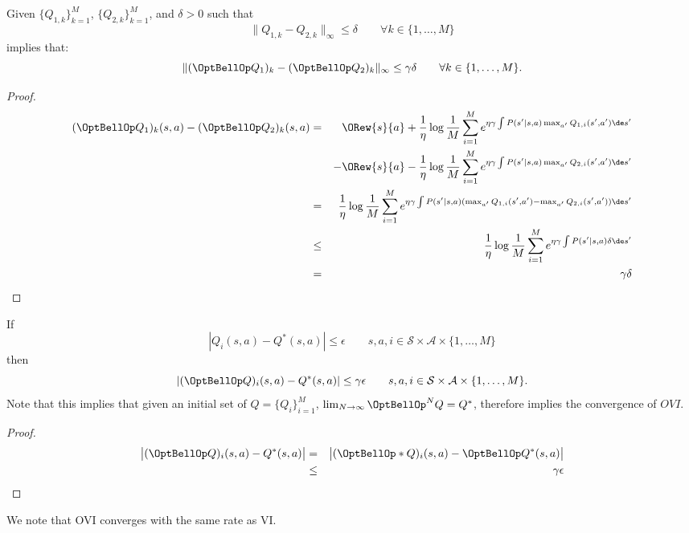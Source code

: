 \begin{lemma}
	Given $\{Q_{1,k}\}_{k=1}^M$, $\{Q_{2,k}\}_{k=1}^M$, and $\delta > 0$ such that
	\begin{equation}
	\|Q_{1,k} - Q_{2,k} \|_{\infty} \leq \delta \quad \quad \forall k \in \{1,\dots,M\} \nonumber
	\end{equation}
	implies that:
	\begin{equation}
	\| (\OptBellOp Q_{1})_k - (\OptBellOp Q_{2})_k \|_{\infty} \leq \gamma\delta \quad \quad \forall k \in \{1,\dots,M\}. \nonumber
	\end{equation}
	\begin{proof}
		\begin{eqnarray*}
			(\OptBellOp Q_{1})_k(s,a) - (\OptBellOp Q_{2})_k(s,a) & = & \ORew{s}{a} +  \frac{1}{\eta}\log \frac{1}{M} \sum_{i=1}^{M} e^{\eta\gamma \int P(s'|s,a) \max_{a'} Q_{1,i}(s',a')\de s'}  \nonumber \\
			& & -\ORew{s}{a} -  \frac{1}{\eta}\log \frac{1}{M} \sum_{i=1}^{M} e^{\eta\gamma \int P(s'|s,a) \max_{a'} Q_{2,i}(s',a')\de s'}  \nonumber \\
			&= &  \frac{1}{\eta}\log \frac{1}{M} \sum_{i=1}^{M} e^{\eta\gamma \int P(s'|s,a) (\max_{a'} Q_{1,i}(s',a') - \max_{a'} Q_{2,i}(s',a'))\de s'}  \nonumber \\
			&\leq &  \frac{1}{\eta}\log \frac{1}{M} \sum_{i=1}^{M} e^{\eta\gamma \int P(s'|s,a) \delta \de s'}  \nonumber \\
			&= & \gamma \delta \nonumber
		\end{eqnarray*}
	\end{proof}
\end{lemma}

\begin{theorem}
	If 
	\begin{equation}
	|Q_i(s,a) - Q^*(s,a)| \leq \epsilon \quad \quad s,a,i \in \mathcal{S} \times \mathcal{A} \times \{1, \dots, M\}
	\end{equation}
	then 
	\begin{equation}
	| (\OptBellOp Q)_i(s,a) - Q^*(s,a)| \leq \gamma \epsilon \quad \quad s,a,i \in \mathcal{S} \times \mathcal{A} \times \{1, \dots, M\}.
	\end{equation}
	Note that this implies that given an initial set of $Q = \{Q_i\}_{i = 1}^{M}$, $\lim_{N\rightarrow\infty} \OptBellOp^NQ = Q^*$, therefore implies the convergence of $OVI$.
	\begin{proof}
		\begin{eqnarray}
		\bigl|(\OptBellOp Q)_i(s,a) - Q^*(s,a)\bigr| & = & \bigl|(\OptBellOp *Q)_i(s,a) - \OptBellOp Q^*(s,a)\bigr| \nonumber \\
		& \leq & \gamma \epsilon \nonumber 
		\end{eqnarray}
	\end{proof}
	\label{oviconvergence}
\end{theorem}
We note that OVI converges with the same rate as VI.


